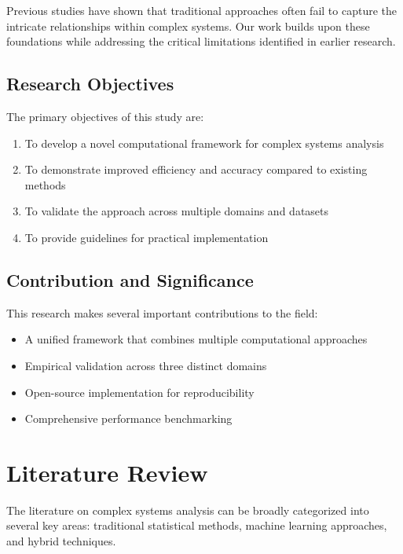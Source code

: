 \documentclass[12pt, letterpaper, onecolumn, final]{article}
\theoremstyle{plain}
\theoremstyle{definition}
\theoremstyle{remark}
\begin{document}
Previous studies have shown \citep{example2023, another2022} that traditional approaches often fail to capture the intricate relationships within complex systems. \lipsum[4] Our work builds upon these foundations while addressing the critical limitations identified in earlier research.

\subsection{Research Objectives}
\label{sec:objectives}

The primary objectives of this study are:
\begin{enumerate}
    \item To develop a novel computational framework for complex systems analysis
    \item To demonstrate improved efficiency and accuracy compared to existing methods
    \item To validate the approach across multiple domains and datasets
    \item To provide guidelines for practical implementation
\end{enumerate}

\lipsum[5]

\subsection{Contribution and Significance}
\label{sec:contribution}

\lipsum[6] This research makes several important contributions to the field:

\begin{itemize}
    \item A unified framework that combines multiple computational approaches
    \item Empirical validation across three distinct domains
    \item Open-source implementation for reproducibility
    \item Comprehensive performance benchmarking
\end{itemize}

\lipsum[7]

\section{Literature Review}
\label{sec:literature}

\lipsum[8-9] The literature on complex systems analysis can be broadly categorized into several key areas: traditional statistical methods, machine learning approaches, and hybrid techniques.
\end{document}

